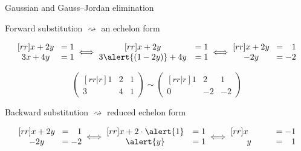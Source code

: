 \documentclass%
[handout]%
{beamer}
\begin{document}

\begin{frame}{Gaussian and Gauss--Jordan elimination}

Forward substitution $\rightsquigarrow$ an echelon form

\begin{example}
\[
  \begin{matrix}[rr]
    x +2y\!&= 1 \\
    3x+4y\!&= 1
\end{matrix}
\iff
\begin{matrix}[rr]
    x + 2y &= 1 \\
    3\alert{(1-2y)}+ 4y&= 1
\end{matrix}
  \iff
 \begin{matrix}[rr]
    x + 2y \! &=\hphantom{-} 1 \\
    -2y \! &= -2
\end{matrix}
\]

\vspace*{-10pt}

\[
\begin{pmatrix}[rr|r]
    1 & 2 & 1\\
    3 & 4 & 1
\end{pmatrix}
\sim
\begin{pmatrix}[rr|r]
    1 & 2 & 1\\
    0 & -2 & -2
\end{pmatrix}
\]
\end{example}

Backward substitution $\rightsquigarrow$ reduced echelon form

\begin{example}
  \[
  \begin{matrix}[rr]
    x + 2y \! &=\hphantom{-} 1 \\
    -2y \! &= -2
  \end{matrix}
  \iff
    \begin{matrix}[rr]
    x + 2\cdot\alert{1} &= 1 \\
    \alert{y}&= 1
\end{matrix}
\iff
    \begin{matrix}[rr]
    x \hphantom{+ 23y} &=-1 \\
    y&=\hphantom{-}1
\end{matrix}
  \]

\vspace*{-10pt}


\end{example}
\end{frame}
\end{document}
